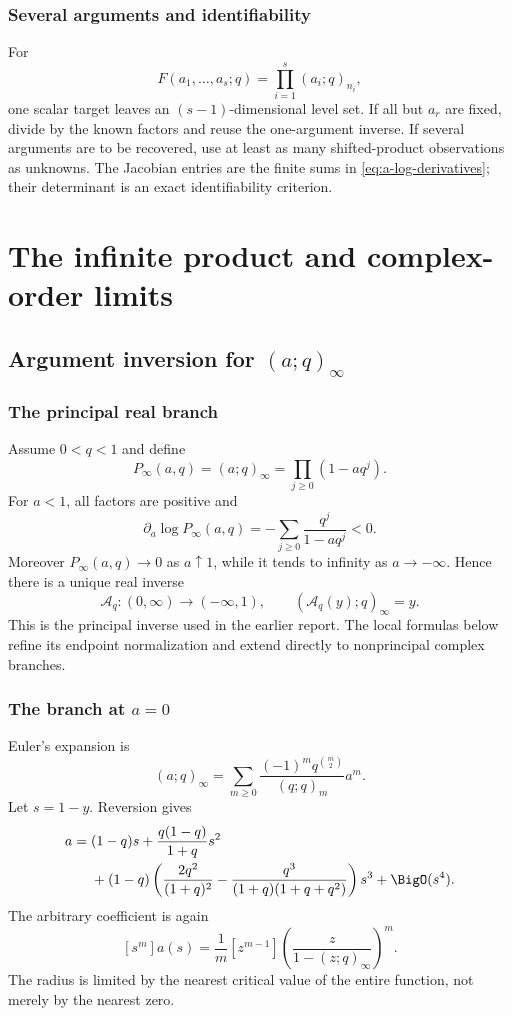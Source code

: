 \documentclass[11pt,letterpaper,oneside,openany]{book}
\theoremstyle{definition}
\theoremstyle{remark}
\newcommand{\Aq}{\mathcal A_q}
\begin{document}
\section{Several arguments and identifiability}
For
\[
 F(a_1,\ldots,a_s;q)=\prod_{i=1}^s(a_i;q)_{n_i},
\]
one scalar target leaves an \((s-1)\)-dimensional level set.  If all but \(a_r\)
are fixed, divide by the known factors and reuse the one-argument inverse.
If several arguments are to be recovered, use at least as many shifted-product
observations as unknowns.  The Jacobian entries are the finite sums in
\cref{eq:a-log-derivatives}; their determinant is an exact identifiability
criterion.

\part{The infinite product and complex-order limits}

\chapter{Argument inversion for \((a;q)_\infty\)}

\section{The principal real branch}
Assume \(0<q<1\) and define
\[
 P_\infty(a,q)=(a;q)_\infty=\prod_{j\ge0}(1-aq^j).
\]
For \(a<1\), all factors are positive and
\[
 \partial_a\log P_\infty(a,q)
 =-\sum_{j\ge0}\frac{q^j}{1-aq^j}<0.
\]
Moreover \(P_\infty(a,q)\to0\) as \(a\uparrow1\), while it tends to infinity
as \(a\to-\infty\).  Hence there is a unique real inverse
\[
 \Aq:(0,\infty)\longrightarrow(-\infty,1),
 \qquad
 (
 \Aq(y);q)_\infty=y.
\]
This is the principal inverse used in the earlier report.  The local formulas
below refine its endpoint normalization and extend directly to nonprincipal
complex branches.

\section{The branch at \(a=0\)}
Euler's expansion is
\begin{equation}
 (a;q)_\infty=\sum_{m\ge0}
 \frac{(-1)^mq^{\binom m2}}{(q;q)_m}a^m.
 \label{eq:euler-infinite-product}
\end{equation}
Let \(s=1-y\).  Reversion gives
\begin{align}
 a={}&(1-q)s+\frac{q(1-q)}{1+q}s^2 \notag \\
 &+(1-q)\left(
 \frac{2q^2}{(1+q)^2}
 -\frac{q^3}{(1+q)(1+q+q^2)}\right)s^3
 +\BigO(s^4).
 \label{eq:infinite-a-near-zero}
\end{align}
The arbitrary coefficient is again
\[
 [s^m]a(s)=\frac1m[z^{m-1}]
 \left(\frac{z}{1-(z;q)_\infty}\right)^m.
\]
The radius is limited by the nearest critical value of the entire function,
not merely by the nearest zero.
\end{document}
